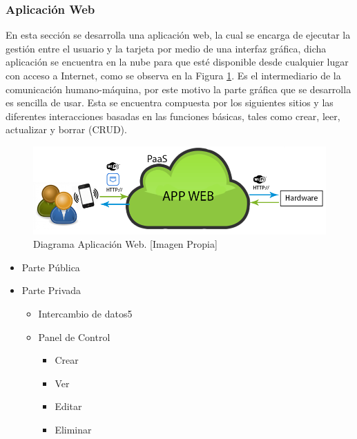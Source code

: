 \subsubsection{Aplicación Web}

En esta sección se desarrolla una aplicación web, la cual se encarga de ejecutar la gestión entre el usuario y la tarjeta por medio de una interfaz gráfica, dicha aplicación se encuentra en la nube para que esté disponible desde cualquier lugar con acceso a Internet, como se observa en la Figura \ref{fig:B_appwD}. Es el intermediario de la comunicación humano-máquina, por este motivo la parte gráfica que se desarrolla es sencilla de usar. Esta se encuentra compuesta por los siguientes sitios y las diferentes interacciones basadas en las funciones básicas, tales como crear, leer, actualizar y borrar (CRUD).\\

\begin{figure}[!t]
	\centering
	\caption[Diagrama Aplicación Web.]{Diagrama Aplicación Web. [Imagen Propia]}
	\label{fig:B_appwD}
	\includegraphics[width=0.7\linewidth]{Imagenes/B_AppWebDllo}
\end{figure}

\begin{itemize}
	\item Parte Pública
	\item Parte Privada
	\begin{itemize}
		\item Intercambio de datos5
		\item Panel de Control
		\begin{itemize}
			\item Crear
			\item Ver
			\item Editar
			\item Eliminar 
		\end{itemize}
	\end{itemize}
\end{itemize}

